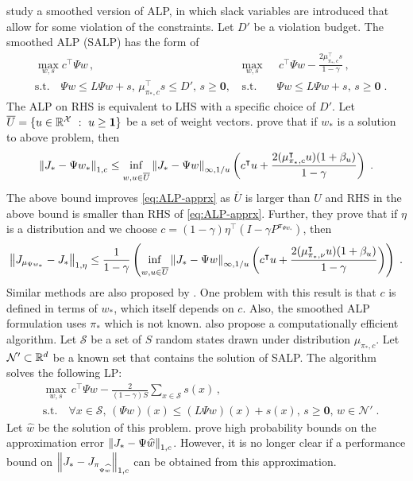\documentclass[11pt]{article}
\begin{document}
\citet{Desai-Farias-Moallemi-2012} study a smoothed version of ALP, in which slack variables are introduced that allow for some violation of the constraints. Let $D'$ be a violation budget. The smoothed ALP (SALP) has the form of
\begin{align*}
&\max_{w,s} c^\top \Psi w\,, &\max_{w,s}&\, c^\top \Psi w - \frac{2 \mu_{\pi_*, c}^\top s}{1-\gamma}\,,  \\
&\mbox{s.t.}\quad \Psi w \le L \Psi w + s,\, \mu_{\pi_*, c}^\top s\le D',\, s\ge {\mathbf 0},\, &\mbox{s.t.}\quad & \Psi w \le L \Psi w + s,\, s\ge {\mathbf 0} \; .
\end{align*}
The ALP on RHS is equivalent to LHS with a specific choice of $D'$. Let $\overline{U}=\{u\in\mathbb R^{\cal X}\ : \ u\ge \mathbf{1} \}$ be a set of weight vectors. \citet{Desai-Farias-Moallemi-2012} prove that if $w_*$ is a solution to above problem, then
\[
\norm{J_* - \Psi w_*}_{1,c} \le \inf_{w, u\in \overline{U}} \norm{J_* - \Psi w}_{\infty, 1/u} \left( c^\top u + \frac{2(\mu_{\pi_*, c}^\top u) (1+ \beta_u)}{1-\gamma} \right) \; .
\]
The above bound improves \eqref{eq:ALP-apprx} as $\overline{U}$ is larger than $U$ and RHS in the above bound is smaller than RHS of \eqref{eq:ALP-apprx}. Further, they prove that if $\eta$ is a distribution and we choose $c=(1-\gamma) \eta^\top (I-\gamma P^{\pi_{\Psi w_*}})$, then
\[
\norm{J_{\mu_{\Psi w_*}}-J_*}_{1,\eta} \le  \frac{1}{1-\gamma} \left( \inf_{w, u\in \overline{U}} \norm{J_* - \Psi w}_{\infty, 1/u} \left( c^\top u + \frac{2(\mu_{\pi_*, \nu}^\top u) (1+\beta_u)}{1-\gamma} \right)  \right) \; .
\]
Similar methods are also proposed by \citet{Petrik-Zilberstein-2009}.
One problem with this result is that $c$ is defined in terms of $w_*$, which itself depends on $c$. %
Also, the smoothed ALP formulation uses $\pi_*$ which is not known. \citet{Desai-Farias-Moallemi-2012} also propose a computationally efficient algorithm. Let $\mathcal S$ be a set of $S$ random states drawn under distribution $\mu_{\pi_*, c}$. Let $\mathcal N'\subset \mathbb R^d$ be a known set that contains the solution of SALP. The algorithm solves the following LP:
\begin{align*}
&\max_{w,s}\, c^\top \Psi w - \frac{2}{(1-\gamma) S}  \sum_{x\in \mathcal S} s(x)\,,  \\
&\mbox{s.t.}\quad \forall x\in \mathcal S,\, (\Psi w)(x) \le (L \Psi w)(x) + s(x),\, s\ge \mathbf 0,\, w\in \mathcal N' \; .
\end{align*}
Let $\widehat w$ be the solution of this problem.
\citet{Desai-Farias-Moallemi-2012} prove high probability bounds on the approximation error $\left\Vert J_* - \Psi \widehat w\right\Vert_{1,c}$. However, it is no longer clear if a performance bound on $\left\Vert J_* - J_{\pi_{\Psi \widehat w}}\right\Vert_{1,c}$ can be obtained from this approximation.
\end{document}
